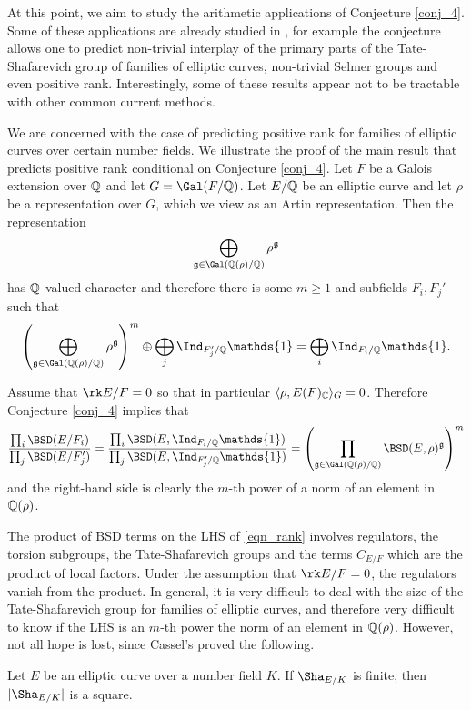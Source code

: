 At this point, we aim to study the arithmetic applications of Conjecture \ref*{conj_4}. Some of these applications are already studied in \cite[\S 3]{DEW1}, for example the conjecture allows one to predict non-trivial interplay of the primary parts of the Tate-Shafarevich group of families of elliptic curves, non-trivial Selmer groups and even positive rank. Interestingly, some of these results appear not to be tractable with other common current methods.

We are concerned with the case of predicting positive rank for families of elliptic curves over certain number fields. We illustrate the proof of the main result that predicts positive rank conditional on Conjecture \ref*{conj_4}. Let $F$ be a Galois extension over $\mathbb{Q}$ and let $G=\Gal(F/\QQ)$. Let $E/\mathbb{Q}$ be an elliptic curve and let $\rho$ be a representation over $G$, which we view as an Artin representation. Then the representation 
$$\bigoplus_{\mathfrak{g}\in\Gal(\QQ(\rho)/\QQ)}\rho^{\mathfrak{g}}$$
has $\mathbb{Q}$-valued character and therefore there is some $m\geq 1$ and subfields $F_i, F_j'$ such that 
$$\left(\bigoplus_{\mathfrak{g}\in\Gal(\QQ(\rho)/\QQ)}\rho^{\mathfrak{g}}\right)^m\oplus\bigoplus_j\Ind_{F'_j/\QQ}\mathds{1}=\bigoplus_i\Ind_{F_i/\QQ}\mathds{1}.$$

Assume that $\rk E/F=0$ so that in particular $\langle \rho, E(F)_{\mathbb{C}}\rangle_G=0$. Therefore Conjecture \ref*{conj_4} implies that 
\begin{equation}\label{eqn_rank}
    \frac{\prod_i\BSD(E/F_i)}{\prod_j\BSD(E/F'_j)}=\frac{\prod_i\BSD(E,\Ind_{F_i/\QQ}\mathds{1})}{\prod_j\BSD(E, \Ind_{F'_j/\QQ}\mathds{1})}=\left(\prod_{\mathfrak{g}\in\Gal(\QQ(\rho)/\QQ)}\BSD(E,\rho)^{\mathfrak{g}}\right)^m
\end{equation}
and the right-hand side is clearly the $m$-th power of a norm of an element in $\mathbb{Q}(\rho)$. 

The product of BSD terms on the LHS of \eqref{eqn_rank} involves regulators, the torsion subgroups, the Tate-Shafarevich groups and the terms $C_{E/F}$ which are the product of local factors. Under the assumption that $\rk E/F=0$, the regulators vanish from the product. In general, it is very difficult to deal with the size of the Tate-Shafarevich group for families of elliptic curves, and therefore very difficult to know if the LHS is an $m$-th power the norm of an element in $\mathbb{Q}(\rho)$. However, not all hope is lost, since Cassel's proved the following.

\begin{thm}
    Let $E$ be an elliptic curve over a number field $K$. If $\Sha_{E/K}$ is finite, then $|\Sha_{E/K}|$ is a square.
\end{thm}

